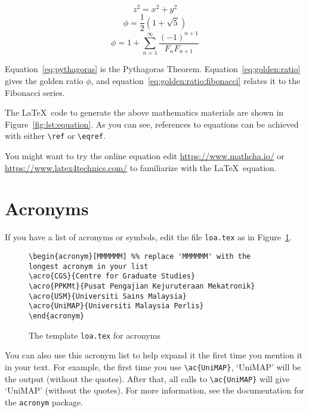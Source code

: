 \begin{equation}\label{eq:pythagoras}
z^2 = x^2 + y^2
\end{equation}
\begin{equation}\label{eq:golden:ratio}
\phi = \frac{1}{2} (1 + \sqrt{5})
\end{equation}
\begin{equation}\label{eq:golden:ratio:fibonacci}
\phi = 1 + \sum ^ {\infty} _ {n=1}
                \frac{ (-1) ^ {n+1} }{ F_n F_{n+1} }
\end{equation}

Equation~\ref{eq:pythagoras} is the Pythagoras Theorem. Equation~\eqref{eq:golden:ratio} gives the golden ratio $\phi$, and equation~\eqref{eq:golden:ratio:fibonacci} relates it to the Fibonacci series.

The \LaTeX\ code to generate the above mathematics materials are shown in Figure~\ref{fig:lst:equation}.  As you can see, references to equations can be achieved with either \verb|\ref| or \verb|\eqref|. 

You might want to try the online equation edit \url{https://www.mathcha.io/} or \url{https://www.latex4technics.com/} to familiarize with the \LaTeX\ equation. 

\section{Acronyms}
\acresetall
If you have a list of acronyms or symbols, edit the file \verb|loa.tex| as in Figure~\ref{fig:acronym}.

\begin{figure}[hbt!]
\begin{lstlisting}
\begin{acronym}[MMMMMM] %% replace 'MMMMMM' with the longest acronym in your list
\acro{CGS}{Centre for Graduate Studies}
\acro{PPKMt}{Pusat Pengajian Kejuruteraan Mekatronik}
\acro{USM}{Universiti Sains Malaysia}
\acro{UniMAP}{Universiti Malaysia Perlis}
\end{acronym}
\end{lstlisting}
\caption{The template \texttt{loa.tex} for acronyms}\label{fig:acronym}
\end{figure}

You can also use this acronym list to help expand it the first time you mention it in your text.  For example, the first time you use \verb|\ac{UniMAP}|, `\ac{UniMAP}' will be the output (without the quotes).  After that, all calls to \verb|\ac{UniMAP}| will give `\ac{UniMAP}' (without the quotes).  For more information, see the documentation for the \texttt{acronym} package.

